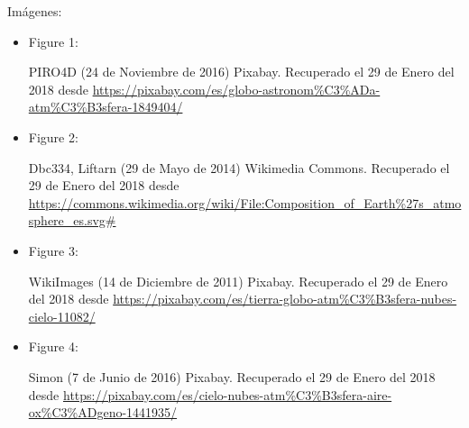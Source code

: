 \documentclass{article}
\begin{document}
\bigskip
\noindent
Imágenes: 
\begin{itemize}
\item Figure 1:

PIRO4D (24 de Noviembre de 2016) Pixabay. Recuperado el 29 de Enero del 2018 desde \url{https://pixabay.com/es/globo-astronom%C3%ADa-atm%C3%B3sfera-1849404/}

\item Figure 2:

Dbc334, Liftarn (29 de Mayo de 2014) Wikimedia Commons. Recuperado el 29 de Enero del 2018 desde \url{https://commons.wikimedia.org/wiki/File:Composition_of_Earth%27s_atmosphere_es.svg#}

\item Figure 3:

WikiImages (14 de Diciembre de 2011) Pixabay. Recuperado el 29 de Enero del 2018 desde \url{https://pixabay.com/es/tierra-globo-atm%C3%B3sfera-nubes-cielo-11082/}

\item Figure 4:

Simon (7 de Junio de 2016) Pixabay. Recuperado el 29 de Enero del 2018 desde \url{https://pixabay.com/es/cielo-nubes-atm%C3%B3sfera-aire-ox%C3%ADgeno-1441935/}

\end{itemize}
\end{document}

